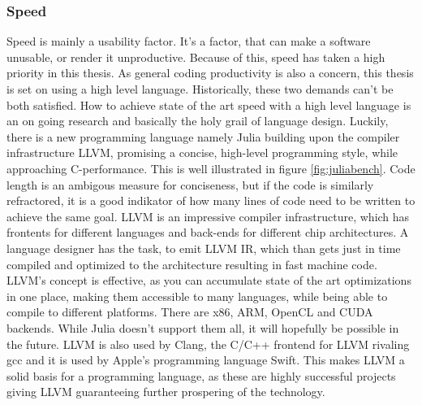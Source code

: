 \subsubsection{Speed}
Speed is mainly a usability factor. It's a factor, that can make a software unusable, or render it unproductive. Because of this, speed has taken a high priority in this thesis. As general coding productivity is also a concern, this thesis is set on using a high level language.
Historically, these two demands can't be both satisfied.
How to achieve state of the art speed with a high level language is an on going research and basically the holy grail of language design.
Luckily, there is a new programming language namely Julia building upon the compiler infrastructure \ac{LLVM}, promising a concise, high-level programming style, while approaching C-performance.
This is well illustrated in figure \ref{fig:juliabench}. Code length is an ambigous measure for conciseness, but if the code is similarly refractored, it is a good indikator of how many lines of code need to be written to achieve the same goal.
\ac{LLVM} is an impressive compiler infrastructure, which has frontents for different languages and back-ends for different chip architectures. 
A language designer has the task, to emit \ac{LLVM} \ac{IR}, which than gets just in time compiled and optimized to the architecture resulting in fast machine code.
\ac{LLVM}'s concept is effective, as you can accumulate state of the art optimizations in one place, making them accessible to many languages, while being able to compile to different platforms. There are x86, ARM, OpenCL and CUDA backends. While Julia doesn't support them all, it will hopefully be possible in the future. 
\ac{LLVM} is also used by Clang, the C/C++ frontend for \ac{LLVM} rivaling gcc and it is used by Apple's programming language Swift. 
This makes \ac{LLVM} a solid basis for a programming language, as these are highly successful projects giving \ac{LLVM} guaranteeing further prospering of the technology.

